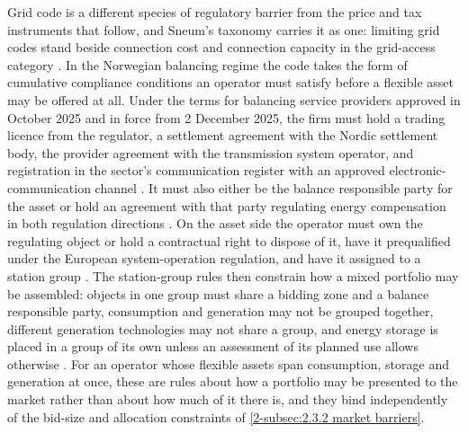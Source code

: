 Grid code is a different species of regulatory barrier from the price and tax instruments that follow, and Sneum's taxonomy carries it as one: limiting grid codes stand beside connection cost and connection capacity in the grid-access category \cite{sneum_barriers_2021}. In the Norwegian balancing regime the code takes the form of cumulative compliance conditions an operator must satisfy before a flexible asset may be offered at all. Under the terms for balancing service providers approved in October 2025 and in force from 2 December 2025, the firm must hold a trading licence from the regulator, a settlement agreement with the Nordic settlement body, the provider agreement with the transmission system operator, and registration in the sector's communication register with an approved electronic-communication channel \cite{statnett_forslag_2025}. It must also either be the balance responsible party for the asset or hold an agreement with that party regulating energy compensation in both regulation directions \cite{statnett_forslag_2025}. On the asset side the operator must own the regulating object or hold a contractual right to dispose of it, have it prequalified under the European system-operation regulation, and have it assigned to a station group \cite{statnett_forslag_2025}. The station-group rules then constrain how a mixed portfolio may be assembled: objects in one group must share a bidding zone and a balance responsible party, consumption and generation may not be grouped together, different generation technologies may not share a group, and energy storage is placed in a group of its own unless an assessment of its planned use allows otherwise \cite{statnett_forslag_2025}. For an operator whose flexible assets span consumption, storage and generation at once, these are rules about how a portfolio may be presented to the market rather than about how much of it there is, and they bind independently of the bid-size and allocation constraints of \autoref{2-subsec:2.3.2 market barriers}.

